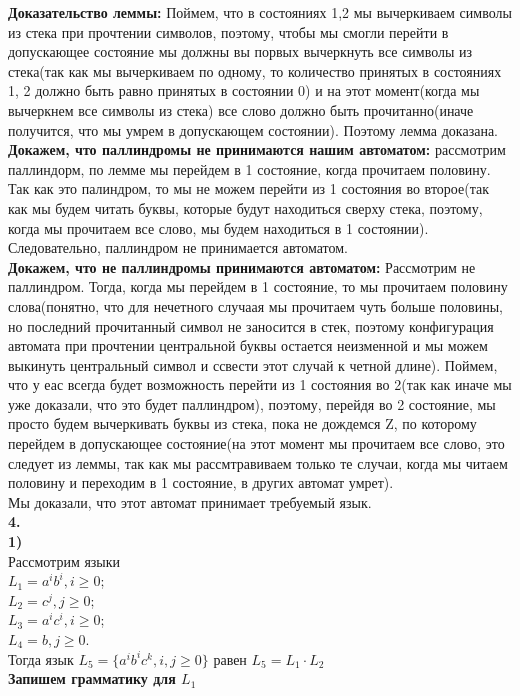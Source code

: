 \documentclass[a4paper,12pt]{article}
\begin{document}
\textbf{Доказательство леммы:} Поймем, что в состояниях 1,2 мы вычеркиваем символы из стека при прочтении символов, поэтому, чтобы мы смогли перейти в допускающее состояние мы должны вы порвых вычеркнуть все символы из стека(так как мы вычеркиваем по одному, то количество принятых в состояниях 1, 2  должно быть равно принятых в состоянии 0) и на этот момент(когда мы вычеркнем все символы из стека) все слово должно быть прочитанно(иначе получится, что мы умрем в допускающем состоянии). Поэтому лемма доказана.\\
\textbf{Докажем, что паллиндромы не принимаются нашим автоматом:} рассмотрим паллиндорм, по лемме мы перейдем в 1 состояние, когда прочитаем половину. Так как это палиндром, то мы не можем перейти из 1 состояния во второе(так как мы будем читать буквы, которые будут находиться сверху стека, поэтому, когда мы прочитаем все слово, мы будем находиться в 1 состоянии). Следовательно, паллиндром не принимается автоматом.\\
\textbf{Докажем, что не паллиндромы принимаются автоматом:} Рассмотрим не паллиндром. Тогда, когда мы перейдем в 1 состояние, то мы прочитаем половину слова(понятно, что для нечетного случаая мы прочитаем чуть больше половины, но последний прочитанный символ не заносится в стек, поэтому конфигурация автомата при прочтении центральной буквы остается неизменной и мы можем выкинуть центральный символ и ссвести этот случай к четной длине). Поймем, что у еас всегда будет возможность перейти из 1 состояния во 2(так как иначе мы уже доказали, что это будет паллиндром), поэтому, перейдя во 2 состояние, мы просто будем вычеркивать буквы из стека, пока не дождемся Z, по которому перейдем в допускающее состояние(на этот момент мы прочитаем все слово, это следует из леммы, так как мы рассмтравиваем только те случаи, когда мы читаем половину и переходим в 1 состояние, в других автомат умрет). \\
Мы доказали, что этот автомат принимает требуемый язык.\\
\textbf{4.}\\
\textbf{1)}\\
Рассмотрим языки \\$L_1={a^ib^i,i \geq 0}$;\\ $L_2={c^j,j \geq 0}$;\\$L_3={a^ic^i,i \geq 0}$;\\$L_4={b,j \geq 0}$.\\
Тогда язык $L_5=\lbrace a^ib^ic^k,i,j\geq 0\rbrace$ равен $L_5=L_1\cdot L_2$\\
\textbf{Запишем грамматику для $L_1$}\\
\end{document}
